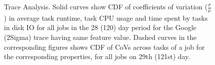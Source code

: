 \begin{figure}
{\label{fig:trace_analysis:google11:diskIO}
}
\caption{Trace Analysis. 
Solid curves show CDF of coefficients of variation ($\frac{\sigma}{\mu}$) in
average task runtime, task CPU usage and time spent by tasks in disk IO
for all jobs in the 28 (120) day period for the Google (2Sigma) trace
having same feature value. Dashed curves in the corresponding figures
shows CDF of CoVs across tasks of a job for the corresponding properties, for all jobs on
29th (121st) day.
}
\vspace{-0.1in}
\label{fig:trace_analysis}
\end{figure}
\fi

